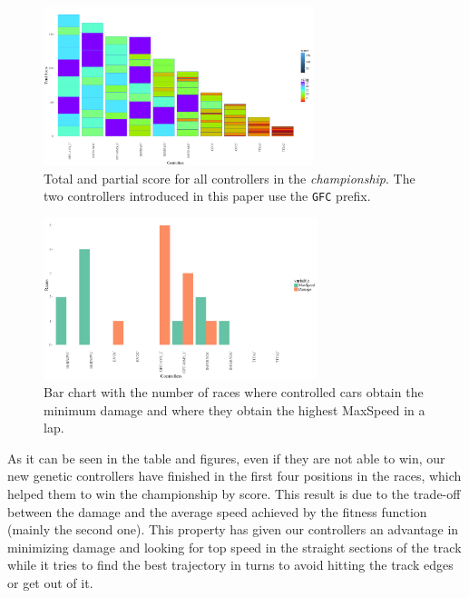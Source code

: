 \documentclass[conference]{IEEEtran}
\begin{document}
\begin{figure}[h!tb]	
  \begin{center}
    \includegraphics[width=0.70\textwidth]{fig/points.png}
    \caption{Total and partial score for all controllers in the {\em
        championship}. The two controllers introduced in
    this paper use the {\tt GFC} prefix.}
    \label{fig:points}	
  \end{center}	
\end{figure}
%
\begin{figure}[!ht]	
	\begin{center}
          \includegraphics[width=8cm]{fig/histsd.png}
		\caption{Bar chart with the number of races where controlled
                  cars obtain the minimum damage and where they obtain the highest MaxSpeed in a lap.}
		\label{fig:damspeed}	
	\end{center}	
\end{figure}

As it can be seen in the table and figures, even if they are not able to win, our new genetic controllers have finished in the first four positions in the races, which helped them to win the  championship by score.
This result is due to the trade-off between the damage and the average speed achieved by the fitness function (mainly the second one). This property has given our controllers an advantage in minimizing damage and looking for top speed in the straight sections of the track while it tries to find the best trajectory in turns to avoid hitting the track edges or get out of it.
\end{document}
